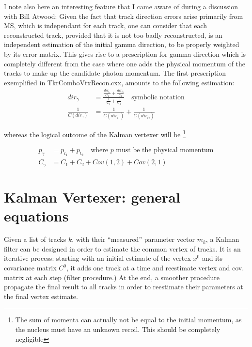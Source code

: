 \documentclass[12pt,final]{article}
\begin{document}
I note also here an interesting feature that I came aware of during a discussion with Bill Atwood:
Given the fact that track direction errors arise primarily from MS, which is independant for each
track, one can consider that each reconstructed track, provided that it is not too badly 
reconstructed, is an independent estimation of the initial gamma direction, to be properly weighted
by its error matrix. This gives rise to a prescription for gamma direction which is completely 
different from the case where one adds the physical momentum of the tracks to make up the candidate
photon momentum. The first prescription exemplified in TkrComboVtxRecon.cxx, amounts to the 
following estimation:
\begin{equation}
\begin{aligned}
dir_\gamma &= \frac{\frac{dir_{t_1}}{C_1}+\frac{dir_{t_2}}{C_2}}{\frac{1}{C_1}+\frac{1}{C_2}} 
\quad\text{symbolic notation}\\
\frac{1}{C(dir_\gamma)} &= \frac{1}{C(dir_{t_1})} + \frac{1}{C(dir_{t_2})}
\end{aligned}
\end{equation}

\noindent whereas the logical outcome of the Kalman vertexer will be
\footnote{The sum of momenta can actually not be equal to the initial momentum, as the nucleus must
have an unknown recoil. This should be completely negligible}

\begin{equation}
\begin{aligned}
p_\gamma &= p_{t_1} + p_{t_2} \quad\text{where $p$ must be the physical momentum}\\
C_\gamma &= C_1 + C_2 + Cov(1,2) + Cov(2,1)
\end{aligned}
\end{equation}


\section{Kalman Vertexer: general equations}
Given a list of tracks $k$, with their ``measured'' parameter 
vector $m_k$, a Kalman filter can be designed in order to estimate the common
vertex of tracks. It is an iterative process: starting with an initial estimate of the vertex $x^0$
and its covariance matrix $C^0$, it adds one track at a time and reestimate vertex and cov. matrix 
at each step (filter procedure.) At the end, a smoother procedure propagate the final result to 
all tracks in order to reestimate their parameters at the final vertex estimate.
\end{document}
